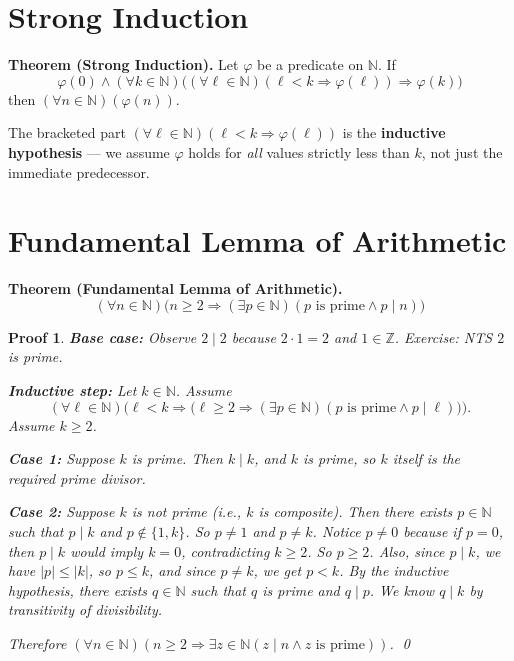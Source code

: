 \documentclass[12pt]{article}
\newcommand{\defn}[1]{\textbf{#1}}
\theoremstyle{proofstyle}
\newtheorem*{proof*}{Proof}
\begin{document}
\section*{Strong Induction}

\textbf{Theorem (Strong Induction).} Let $\varphi$ be a predicate on $\mathbb{N}$.
If
\[
    \varphi(0) \wedge (\forall k \in \mathbb{N})\Big((\forall \ell \in \mathbb{N})
    (\ell < k \Rightarrow \varphi(\ell)) \Rightarrow \varphi(k)\Big)
\]
then $(\forall n \in \mathbb{N})(\varphi(n))$.

The bracketed part $(\forall \ell \in \mathbb{N})(\ell < k \Rightarrow \varphi(\ell))$
is the \defn{inductive hypothesis} --- we assume $\varphi$ holds for
\textit{all} values strictly less than $k$, not just the immediate predecessor.

\section*{Fundamental Lemma of Arithmetic}

\textbf{Theorem (Fundamental Lemma of Arithmetic).}
\[
    (\forall n \in \mathbb{N})\Big(n \geq 2 \Rightarrow (\exists p \in \mathbb{N})
    (p \text{ is prime} \wedge p \mid n)\Big)
\]

\begin{proof*}
    \textbf{Base case:} Observe $2 \mid 2$ because $2 \cdot 1 = 2$ and $1 \in \mathbb{Z}$.
    Exercise: NTS $2$ is prime.

    \textbf{Inductive step:} Let $k \in \mathbb{N}$. Assume
    \[
        (\forall \ell \in \mathbb{N})\Big(\ell < k \Rightarrow
        \big(\ell \geq 2 \Rightarrow (\exists p \in \mathbb{N})(p \text{ is prime}
        \wedge p \mid \ell)\big)\Big).
    \]
    Assume $k \geq 2$.

    \textbf{Case 1:} Suppose $k$ is prime. Then $k \mid k$, and $k$ is prime,
    so $k$ itself is the required prime divisor.

    \textbf{Case 2:} Suppose $k$ is not prime (i.e., $k$ is composite). Then
    there exists $p \in \mathbb{N}$ such that $p \mid k$ and $p \notin \{1, k\}$.
    So $p \neq 1$ and $p \neq k$. Notice $p \neq 0$ because if $p = 0$, then
    $p \mid k$ would imply $k = 0$, contradicting $k \geq 2$. So $p \geq 2$.
    Also, since $p \mid k$, we have $|p| \leq |k|$, so $p \leq k$, and since
    $p \neq k$, we get $p < k$. By the inductive hypothesis, there exists
    $q \in \mathbb{N}$ such that $q$ is prime and $q \mid p$. We know $q \mid k$
    by transitivity of divisibility.

    Therefore $(\forall n \in \mathbb{N})(n \geq 2 \Rightarrow \exists z \in \mathbb{N}
    (z \mid n \wedge z \text{ is prime}))$. \qed
\end{proof*}
\end{document}

